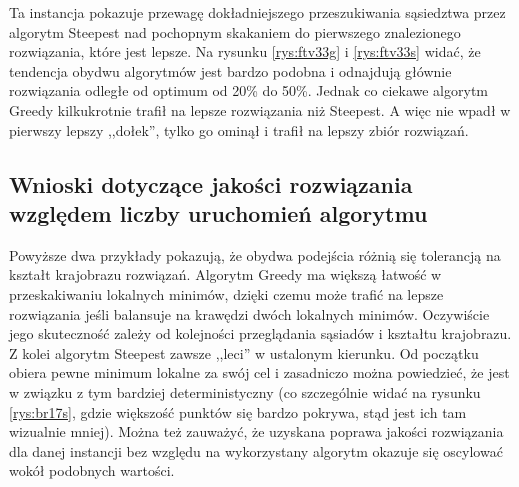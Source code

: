 Ta instancja pokazuje przewagę dokładniejszego przeszukiwania sąsiedztwa przez algorytm Steepest nad pochopnym skakaniem do pierwszego znalezionego rozwiązania, które jest lepsze. Na rysunku \ref{rys:ftv33g} i \ref{rys:ftv33s} widać, że tendencja obydwu algorytmów jest bardzo podobna i odnajdują głównie rozwiązania odległe od optimum od 20\% do 50\%. Jednak co ciekawe algorytm Greedy kilkukrotnie trafił na lepsze rozwiązania niż Steepest. A więc nie wpadł w pierwszy lepszy ,,dołek'', tylko go ominął i trafił na lepszy zbiór rozwiązań.

\subsection{Wnioski dotyczące jakości rozwiązania względem liczby uruchomień algorytmu}
Powyższe dwa przykłady pokazują, że obydwa podejścia różnią się tolerancją na kształt krajobrazu rozwiązań. Algorytm Greedy ma większą łatwość w przeskakiwaniu lokalnych minimów, dzięki czemu może trafić na lepsze rozwiązania jeśli balansuje na krawędzi dwóch lokalnych minimów. Oczywiście jego skuteczność zależy od kolejności przeglądania sąsiadów i kształtu krajobrazu. Z kolei algorytm Steepest zawsze ,,leci'' w ustalonym kierunku. Od początku obiera pewne minimum lokalne za swój cel i zasadniczo można powiedzieć, że jest w związku z tym bardziej deterministyczny (co szczególnie widać na rysunku \ref{rys:br17s}, gdzie większość punktów się bardzo pokrywa, stąd jest ich tam wizualnie mniej). Można też zauważyć, że uzyskana poprawa jakości rozwiązania dla danej instancji bez względu na wykorzystany algorytm okazuje się oscylować wokół podobnych wartości.